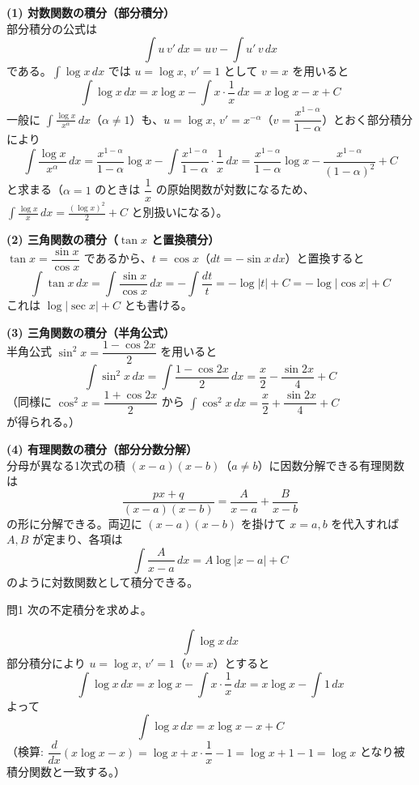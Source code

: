 \documentclass[a4paper,11pt]{article}
\begin{document}


\noindent
\textbf{(1) 対数関数の積分（部分積分）}\\
部分積分の公式は
\[
\int u\, v' \, dx = uv - \int u'\, v \, dx
\]
である。$\int \log x \, dx$ では $u = \log x$, $v' = 1$ として $v = x$ を用いると
\[
\int \log x \, dx = x\log x - \int x \cdot \frac{1}{x}\, dx = x\log x - x + C
\]
一般に $\displaystyle\int \frac{\log x}{x^{\alpha}}\, dx$（$\alpha \neq 1$）も、$u = \log x$, $v' = x^{-\alpha}$（$v = \dfrac{x^{1-\alpha}}{1-\alpha}$）とおく部分積分により
\[
\int \frac{\log x}{x^{\alpha}}\, dx
= \frac{x^{1-\alpha}}{1-\alpha}\log x - \int \frac{x^{1-\alpha}}{1-\alpha}\cdot\frac{1}{x}\, dx
= \frac{x^{1-\alpha}}{1-\alpha}\log x - \frac{x^{1-\alpha}}{(1-\alpha)^{2}} + C
\]
と求まる（$\alpha = 1$ のときは $\dfrac{1}{x}$ の原始関数が対数になるため、$\displaystyle\int \frac{\log x}{x}\, dx = \frac{(\log x)^{2}}{2} + C$ と別扱いになる）。

\noindent
\textbf{(2) 三角関数の積分（$\tan x$ と置換積分）}\\
$\tan x = \dfrac{\sin x}{\cos x}$ であるから、$t = \cos x$（$dt = -\sin x\, dx$）と置換すると
\[
\int \tan x \, dx = \int \frac{\sin x}{\cos x}\, dx = -\int \frac{dt}{t} = -\log|t| + C = -\log|\cos x| + C
\]
これは $\log|\sec x| + C$ とも書ける。

\noindent
\textbf{(3) 三角関数の積分（半角公式）}\\
半角公式 $\sin^{2} x = \dfrac{1 - \cos 2x}{2}$ を用いると
\[
\int \sin^{2} x \, dx = \int \frac{1 - \cos 2x}{2}\, dx = \frac{x}{2} - \frac{\sin 2x}{4} + C
\]
（同様に $\cos^{2} x = \dfrac{1+\cos 2x}{2}$ から $\displaystyle\int \cos^{2} x\, dx = \dfrac{x}{2} + \dfrac{\sin 2x}{4} + C$ が得られる。）

\noindent
\textbf{(4) 有理関数の積分（部分分数分解）}\\
分母が異なる1次式の積 $(x-a)(x-b)$（$a \neq b$）に因数分解できる有理関数は
\[
\frac{px+q}{(x-a)(x-b)} = \frac{A}{x-a} + \frac{B}{x-b}
\]
の形に分解できる。両辺に $(x-a)(x-b)$ を掛けて $x = a, b$ を代入すれば $A, B$ が定まり、各項は
\[
\int \frac{A}{x-a}\, dx = A\log|x-a| + C
\]
のように対数関数として積分できる。

\clearpage
\begin{mondaiboxS}{問1}
次の不定積分を求めよ。
\end{mondaiboxS}
\[
\int \log x \, dx
\]
\kaitou
部分積分により $u = \log x$, $v' = 1$（$v = x$）とすると
\[
\int \log x \, dx = x\log x - \int x\cdot\frac{1}{x}\, dx = x\log x - \int 1 \, dx
\]
よって
\[
\boxed{\; \int \log x \, dx = x\log x - x + C \;}
\]
（検算: $\dfrac{d}{dx}(x\log x - x) = \log x + x\cdot\dfrac{1}{x} - 1 = \log x + 1 - 1 = \log x$ となり被積分関数と一致する。）
\end{document}
